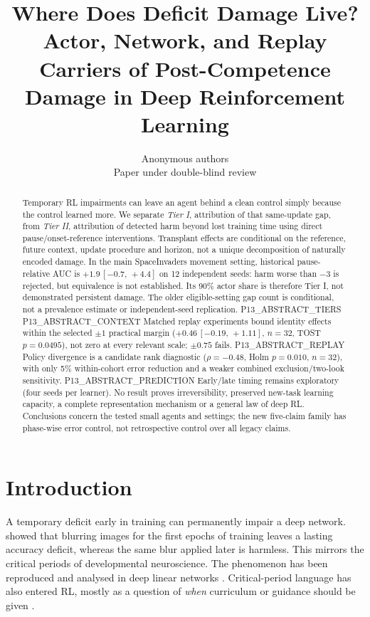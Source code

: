 \documentclass[10pt]{article} %
\title{Where Does Deficit Damage Live? Actor, Network, and Replay Carriers of Post-Competence Damage in Deep Reinforcement Learning}
\author{\name Anonymous authors \\
      \addr Paper under double-blind review}
\newcommand{\ci}[2]{\,[#1,\,#2]}
\begin{document}
\maketitle

\begin{abstract}
Temporary RL impairments can leave an agent behind a clean control simply because the control learned more. We separate \emph{Tier I}, attribution of that same-update gap, from \emph{Tier II}, attribution of detected harm beyond lost training time using direct pause/onset-reference interventions. Transplant effects are conditional on the reference, future context, update procedure and horizon, not a unique decomposition of naturally encoded damage.
In the main SpaceInvaders movement setting, historical pause-relative AUC is $+1.9\ci{-0.7}{+4.4}$ on 12 independent seeds: harm worse than $-3$ is rejected, but equivalence is not established. Its 90\% actor share is therefore Tier I, not demonstrated persistent damage. The older eligible-setting gap count is conditional, not a prevalence estimate or independent-seed replication. P13_ABSTRACT_TIERS
P13_ABSTRACT_CONTEXT
Matched replay experiments bound identity effects within the selected $\pm1$ practical margin ($+0.46\ci{-0.19}{+1.11}$, $n=32$, TOST $p=0.0495$), not zero at every relevant scale; $\pm0.75$ fails. P13_ABSTRACT_REPLAY
Policy divergence is a candidate rank diagnostic ($\rho=-0.48$, Holm $p=0.010$, $n=32$), with only 5\% within-cohort error reduction and a weaker combined exclusion/two-look sensitivity. P13_ABSTRACT_PREDICTION
Early/late timing remains exploratory (four seeds per learner). No result proves irreversibility, preserved new-task learning capacity, a complete representation mechanism or a general law of deep RL. Conclusions concern the tested small agents and settings; the new five-claim family has phase-wise error control, not retrospective control over all legacy claims.
\end{abstract}

\section{Introduction}

A temporary deficit early in training can permanently impair a deep network. \citet{achille2019critical} showed that blurring images for the first epochs of training leaves a lasting accuracy deficit, whereas the same blur applied later is harmless. This mirrors the critical periods of developmental neuroscience. The phenomenon has been reproduced and analysed in deep linear networks \citep{kleinman2024critical}. Critical-period language has also entered RL, mostly as a question of \emph{when} curriculum or guidance should be given \citep{park2021toddler,park2022multistage,dekleijn2022critical}.
\end{document}
